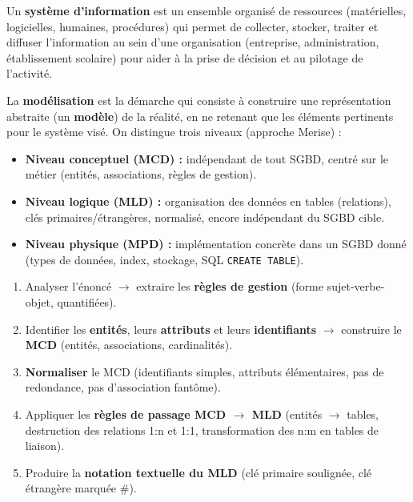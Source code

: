 \documentclass[11pt]{article}
\begin{document}
\begin{definition}
Un \textbf{système d'information} est un ensemble organisé de ressources (matérielles, logicielles, humaines, procédures) qui permet de collecter, stocker, traiter et diffuser l'information au sein d'une organisation (entreprise, administration, établissement scolaire) pour aider à la prise de décision et au pilotage de l'activité.
\end{definition}

\begin{definition}
La \textbf{modélisation} est la démarche qui consiste à construire une représentation abstraite (un \textbf{modèle}) de la réalité, en ne retenant que les éléments pertinents pour le système visé. On distingue trois niveaux (approche Merise) :
\begin{itemize}
\item \textbf{Niveau conceptuel (MCD) :} indépendant de tout SGBD, centré sur le métier (entités, associations, règles de gestion).
\item \textbf{Niveau logique (MLD) :} organisation des données en tables (relations), clés primaires/étrangères, normalisé, encore indépendant du SGBD cible.
\item \textbf{Niveau physique (MPD) :} implémentation concrète dans un SGBD donné (types de données, index, stockage, SQL \texttt{CREATE TABLE}).
\end{itemize}
\end{definition}

\begin{aretenir}
\begin{enumerate}
\item Analyser l'énoncé $\to$ extraire les \textbf{règles de gestion} (forme sujet-verbe-objet, quantifiées).
\item Identifier les \textbf{entités}, leurs \textbf{attributs} et leurs \textbf{identifiants} $\to$ construire le \textbf{MCD} (entités, associations, cardinalités).
\item \textbf{Normaliser} le MCD (identifiants simples, attributs élémentaires, pas de redondance, pas d'association fantôme).
\item Appliquer les \textbf{règles de passage MCD $\to$ MLD} (entités $\to$ tables, destruction des relations 1:n et 1:1, transformation des n:m en tables de liaison).
\item Produire la \textbf{notation textuelle du MLD} (clé primaire soulignée, clé étrangère marquée \#).
\end{enumerate}
\end{aretenir}
\end{document}
